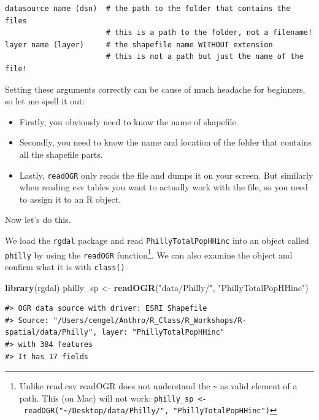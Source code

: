 \documentclass[]{book}
\newenvironment{Shaded}{\begin{snugshade}}{\end{snugshade}}
\newcommand{\KeywordTok}[1]{\textcolor[rgb]{0.13,0.29,0.53}{\textbf{#1}}}
\newcommand{\StringTok}[1]{\textcolor[rgb]{0.31,0.60,0.02}{#1}}
\newcommand{\NormalTok}[1]{#1}
\let\rmarkdownfootnote\footnote%
\def\footnote{\protect\rmarkdownfootnote}
\begin{document}
\begin{verbatim}
datasource name (dsn)  # the path to the folder that contains the files
                       # this is a path to the folder, not a filename!
layer name (layer)     # the shapefile name WITHOUT extension
                       # this is not a path but just the name of the file!
\end{verbatim}

Setting these arguments correctly can be cause of much headache for
beginners, so let me spell it out:

\begin{itemize}
\item
  Firstly, you obviously need to know the name of shapefile.
\item
  Secondly, you need to know the name and location of the folder that
  contains all the shapefile parts.
\item
  Lastly, \texttt{readOGR} only reads the file and dumps it on your
  screen. But similarly when reading csv tables you want to actually
  work with the file, so you need to assign it to an R object.
\end{itemize}

Now let's do this.

We load the \texttt{rgdal} package and read \texttt{PhillyTotalPopHHinc}
into an object called \texttt{philly} by using the \texttt{readOGR}
function\footnote{Unlike read.csv readOGR does not understand the
  \texttt{\textasciitilde{}} as valid element of a path. This (on Mac)
  will not work:
  \texttt{philly\_sp\ \textless{}-\ readOGR("\textasciitilde{}/Desktop/data/Philly/",\ "PhillyTotalPopHHinc")}}.
We can also examine the object and confirm what it is with
\texttt{class()}.

\begin{Shaded}
\begin{Highlighting}[]
\KeywordTok{library}\NormalTok{(rgdal)}
\NormalTok{philly_sp <-}\StringTok{ }\KeywordTok{readOGR}\NormalTok{(}\StringTok{"data/Philly/"}\NormalTok{, }\StringTok{"PhillyTotalPopHHinc"}\NormalTok{) }
\end{Highlighting}
\end{Shaded}

\begin{verbatim}
#> OGR data source with driver: ESRI Shapefile 
#> Source: "/Users/cengel/Anthro/R_Class/R_Workshops/R-spatial/data/Philly", layer: "PhillyTotalPopHHinc"
#> with 384 features
#> It has 17 fields
\end{verbatim}
\end{document}
